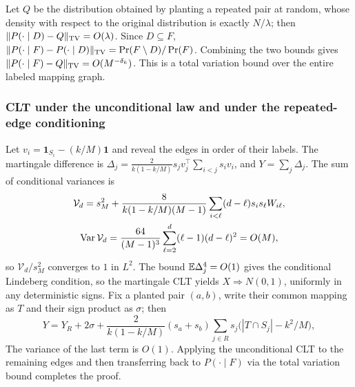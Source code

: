 Let $Q$ be the distribution obtained by planting a repeated pair at random, whose density with
respect to the original distribution is exactly $N/\lambda$; then
$\|P(\cdot\mid D)-Q\|_{\rm TV}=O(\lambda)$. Since $D\subseteq F$,
$\|P(\cdot\mid F)-P(\cdot\mid D)\|_{\rm TV}=\Pr(F\setminus D)/\Pr(F)$. Combining the two bounds
gives $\|P(\cdot\mid F)-Q\|_{\rm TV}=O(M^{-\delta_k})$. This is a total variation bound over the
entire labeled mapping graph.

\subsubsection{CLT under the unconditional law and under the repeated-edge conditioning}
Let $v_i=\mathbf1_{S_i}-(k/M)\mathbf1$ and reveal the edges in order of their labels. The
martingale difference is $\Delta_j=\frac{2}{k(1-k/M)}s_jv_j^\top\sum_{i<j}s_iv_i$, and
$Y=\sum_j\Delta_j$. The sum of conditional variances is
\begin{gather*}
\mathcal
V_d=s_M^2+\frac{8}{k(1-k/M)(M-1)}\sum_{i<\ell}(d-\ell)s_is_\ell
W_{i\ell},\\
\operatorname{Var}\mathcal
V_d=\frac{64}{(M-1)^3}\sum_{\ell=2}^d(\ell-1)(d-\ell)^2=O(M),
\end{gather*}
so $\mathcal V_d/s_M^2$ converges to $1$ in $L^2$. The bound $\mathbb E\Delta_j^4=O(1)$ gives the
conditional Lindeberg condition, so the martingale CLT yields $X\Rightarrow N(0,1)$, uniformly in
any deterministic signs. Fix a planted pair $(a,b)$, write their common mapping as $T$ and their
sign product as $\sigma$; then
\begin{equation*}
Y=Y_R+2\sigma+\frac{2}{k(1-k/M)}(s_a+s_b)\sum_{j\in R}s_j\bigl(|T\cap S_j|-k^2/M\bigr),
\end{equation*}
The variance of the last term is $O(1)$. Applying the unconditional CLT to the remaining edges and
then transferring back to $P(\cdot\mid F)$ via the total variation bound completes the proof.


